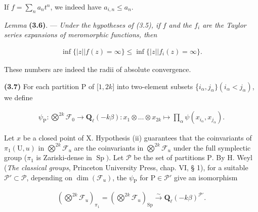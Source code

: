 \documentclass[10pt,leqno]{article}
\begin{document}
\noindent If \(f=\sum _{n} a_{n} t^{n}\), we indeed have \(a_{i,n}\leq a_{n}\).\par

\noindent \emph{Lemma} \textbf{(3.6)}. — {\itshape Under the hypotheses of (3.5), if \(f\) and the \(f_{i}\) are the Taylor series expansions of meromorphic functions, then}\par

\begin{equation*}\begin{gathered}\operatorname{inf}\{|z| | f(z)=\infty \} \leq  \operatorname{inf}\{|z| | f_{i}(z)=\infty \}.\end{gathered}\end{equation*}

\noindent These numbers are indeed the radii of absolute convergence.\par

\clearpage

\label{physical-14}

\noindent \textbf{(3.7)} For each partition \(\mathrm{P}\) of [\(1,2k]\) into two-element subsets \{\(i_{\alpha },j_{\alpha }\} (i_{\alpha }<j_{\alpha })\), we define\par

\begin{equation*}\begin{gathered}\psi _{\mathrm{P}} : \bigotimes\limits^{2k}\mathcal{F} _{0} \longrightarrow  \mathbf{Q}_{\ell }(- k\beta ) : x_{1}\otimes \ldots \otimes x_{2k} \longmapsto  \prod _{\alpha } \psi (x_{i_{\alpha }},x_{j_{\alpha }}).\end{gathered}\end{equation*}

\noindent Let \(x\) be a closed point of \(\mathrm{X}\). Hypothesis (ii) guarantees that the coinvariants of \(\pi _{1}(\mathrm{U},u)\) in \(\bigotimes\limits^{2k}\mathcal{F} _{u}\) are the coinvariants in \(\bigotimes\limits^{2k}\mathcal{F} _{u}\) under the full symplectic group (\(\pi _{1}\) is Zariski-dense in \(\operatorname{Sp})\). Let \(\mathcal{P} \) be the set of partitions \(\mathrm{P}\). By \(\mathrm{H}\). Weyl (\emph{The classical groups}, Princeton University Press, chap. VI, § 1), for a suitable \(\mathcal{P} '\subset \mathcal{P} \), depending on \(\operatorname{dim}(\mathcal{F} _{u})\), the \(\psi _{\mathrm{P}}\) for \(\mathrm{P}\in \mathcal{P} '\) give an isomorphism\par

\begin{equation*}\begin{gathered}(\bigotimes\limits^{2k}\mathcal{F} _{u})_{\pi _{1}} = (\bigotimes\limits^{2k}\mathcal{F} _{u})_{\operatorname{Sp}} \xrightarrow{\sim } \mathbf{Q}_{\ell }(- k\beta )^{\mathcal{P} '}.\end{gathered}\end{equation*}
\end{document}
